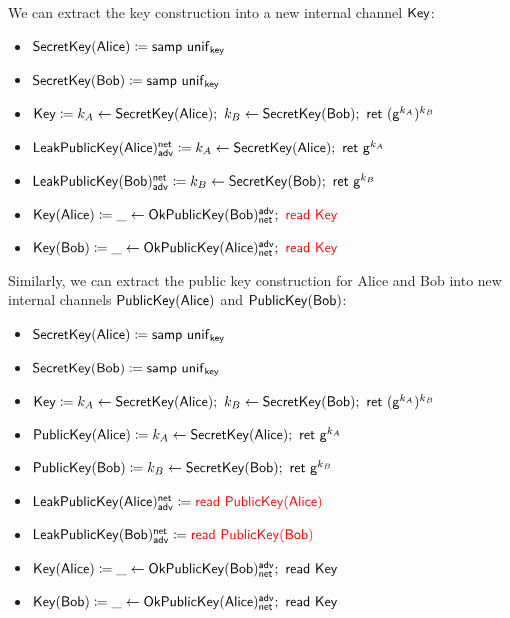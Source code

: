 \noindent We can extract the key construction into a new internal channel $\mathsf{Key}$:

\begin{itemize}
\item $\mathsf{SecretKey}(\mathsf{Alice}) \coloneqq \mathsf{samp} \ \mathsf{unif}_{\mathsf{key}}$
\item $\mathsf{SecretKey}(\mathsf{Bob}) \coloneqq \mathsf{samp} \ \mathsf{unif}_{\mathsf{key}}$
\item {\color{red} $\Key \coloneqq k_A \leftarrow \SecretKey(\Alice); \ k_B \leftarrow \SecretKey(\Bob); \ \ret{(\gen^{k_A})^{k_B}}$}
\item $\LeakPublicKey(\Alice)^\net_\adv \coloneqq k_A \leftarrow \SecretKey(\Alice); \ \ret{\gen^{k_A}}$
\item $\LeakPublicKey(\Bob)^\net_\adv \coloneqq k_B \leftarrow \SecretKey(\Bob); \ \ret{\gen^{k_B}}$
\item $\mathsf{Key}(\mathsf{Alice}) \coloneqq \_ \leftarrow \mathsf{OkPublicKey}(\mathsf{Bob})^{\mathsf{adv}}_{\mathsf{net}}; \ {\color{red} \mathsf{read} \ \mathsf{Key}}$
\item $\mathsf{Key}(\mathsf{Bob}) \coloneqq \_ \leftarrow \mathsf{OkPublicKey}(\mathsf{Alice})^{\mathsf{adv}}_{\mathsf{net}}; \ {\color{red} \mathsf{read} \ \mathsf{Key}}$
\end{itemize}

\noindent Similarly, we can extract the public key construction for Alice and Bob into new internal channels $\mathsf{PublicKey}(\mathsf{Alice})$ and $\mathsf{PublicKey}(\mathsf{Bob})$:

\begin{itemize}
\item $\mathsf{SecretKey}(\mathsf{Alice}) \coloneqq \mathsf{samp} \ \mathsf{unif}_{\mathsf{key}}$
\item $\mathsf{SecretKey}(\mathsf{Bob}) \coloneqq \mathsf{samp} \ \mathsf{unif}_{\mathsf{key}}$
\item $\Key \coloneqq k_A \leftarrow \SecretKey(\Alice); \ k_B \leftarrow \SecretKey(\Bob); \ \ret{(\gen^{k_A})^{k_B}}$
\item {\color{red} $\PublicKey(\Alice) \coloneqq k_A \leftarrow \SecretKey(\Alice); \ \ret{\gen^{k_A}}$}
\item {\color{red} $\mathsf{PublicKey}(\mathsf{Bob}) \coloneqq k_B \leftarrow \mathsf{SecretKey}(\mathsf{Bob}); \ \mathsf{ret} \ \mathsf{g}^{k_B}$}
\item $\mathsf{LeakPublicKey}(\mathsf{Alice})^{\mathsf{net}}_{\mathsf{adv}} \coloneqq {\color{red} \mathsf{read} \ \mathsf{PublicKey}(\mathsf{Alice})}$
\item $\mathsf{LeakPublicKey}(\mathsf{Bob})^{\mathsf{net}}_{\mathsf{adv}} \coloneqq {\color{red} \mathsf{read} \ \mathsf{PublicKey}(\mathsf{Bob})}$
\item $\mathsf{Key}(\mathsf{Alice}) \coloneqq \_ \leftarrow \mathsf{OkPublicKey}(\mathsf{Bob})^{\mathsf{adv}}_{\mathsf{net}}; \ \mathsf{read} \ \mathsf{Key}$
\item $\mathsf{Key}(\mathsf{Bob}) \coloneqq \_ \leftarrow \mathsf{OkPublicKey}(\mathsf{Alice})^{\mathsf{adv}}_{\mathsf{net}}; \ \mathsf{read} \ \mathsf{Key}$
\end{itemize}

